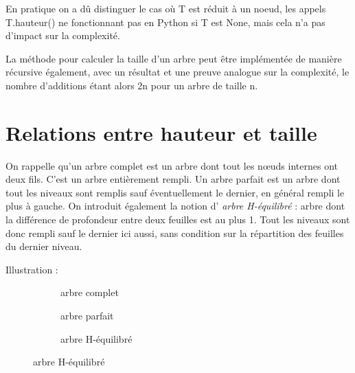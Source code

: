 \documentclass{report}
\begin{document}
En pratique on a dû distinguer le cas où T est réduit à un noeud, les appels T.hauteur() ne fonctionnant pas en Python si T est None, mais cela n'a pas d'impact sur la complexité.

La méthode pour calculer la taille d'un arbre peut être implémentée de manière récursive également, avec un résultat et une preuve analogue sur la complexité, le nombre d'additions étant alors 2n pour un arbre de taille n.

\section{Relations entre hauteur et taille}

On rappelle qu'un arbre complet est un arbre dont tout les nœuds internes ont deux fils. 
C'est un arbre entièrement rempli.
Un arbre parfait est un arbre dont tout les niveaux sont remplis sauf éventuellement le dernier, en général rempli le plus à gauche. 
On introduit également la notion d' \textit{arbre H-équilibré} : arbre dont la différence de profondeur entre deux feuilles est au plus 1. Tout les niveaux sont donc rempli sauf le dernier ici aussi, sans condition sur la répartition des feuilles du dernier niveau. 

Illustration : 

\begin{figure}[h]
\centering
\begin{subfigure}[b]{.3\textwidth}
\caption{arbre complet}
\end{subfigure}
\begin{subfigure}[b]{.3\textwidth}
\caption{arbre parfait}
\end{subfigure}
\begin{subfigure}[b]{.3\textwidth}
\caption{arbre H-équilibré}
\end{subfigure}
\end{figure}
\end{document}
